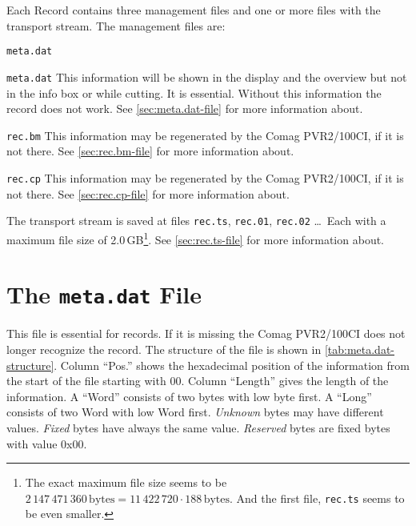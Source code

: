 \documentclass{scrartcl}
\newcommand*{\Comag}{Comag PVR2/100CI\xspace}
\begin{document}
Each Record contains three management files and one or more files with the
transport stream. The management files are:
\begin{labeling}[:]{\texttt{meta.dat}}
\item [\texttt{meta.dat}] This information will be shown in the display and
  the overview but not in the info box or while cutting. It is
  essential. Without this information the record does not work. See
  \autoref{sec:meta.dat-file} for more information about.
\item [\texttt{rec.bm}] This information may be regenerated by the \Comag, if
  it is not there. See \autoref{sec:rec.bm-file} for more information about.
\item [\texttt{rec.cp}] This information may be regenerated by the \Comag, if
  it is not there. See \autoref{sec:rec.cp-file} for more information about.
\end{labeling}

The transport stream is saved at files \texttt{rec.ts}, \texttt{rec.01},
\texttt{rec.02} \dots\@\ Each with a maximum file size of 2.0\,GB\footnote{The
  exact maximum file size seems to be $2\,147\,471\,360\,\textrm{bytes} =
  11\,422\,720 \cdot 188\,\textrm{bytes}$. And the first file, \texttt{rec.ts}
  seems to be even smaller.}. See \autoref{sec:rec.ts-file} for more
information about.

\section{The \texttt{meta.dat} File}
\label{sec:meta.dat-file}

This file is essential for records. If it is missing the \Comag does not
longer recognize the record. The structure of the file is shown in
\autoref{tab:meta.dat-structure}. Column ``Pos.'' shows the hexadecimal
position of the information from the start of the file starting with
00. Column ``Length'' gives the length of the information. A ``Word'' consists
of two bytes with low byte first. A ``Long'' consists of two Word with low
Word first. \emph{Unknown} bytes may have different values. \emph{Fixed} bytes
have always the same value. \emph{Reserved} bytes are fixed bytes with value
0x00.
\end{document}
